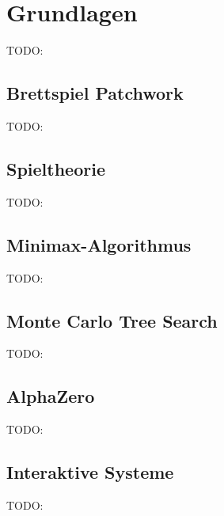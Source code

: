\chapter{Grundlagen}
\label{chapter:grundlagen}

TODO:

\section{Brettspiel Patchwork}
\label{chapter:brettspiel-patchwork}

TODO:

\section{Spieltheorie}
\label{chapter:spieltheorie}

TODO:

\section{Minimax-Algorithmus}
\label{chapter:minimax-algorithmus}

TODO:

\section{Monte Carlo Tree Search}
\label{chapter:monte-carlo-tree-search}

TODO:

\section{AlphaZero}
\label{chapter:alphazero}

TODO:

\section{Interaktive Systeme}
\label{chapter:interaktive-systeme}

TODO:

